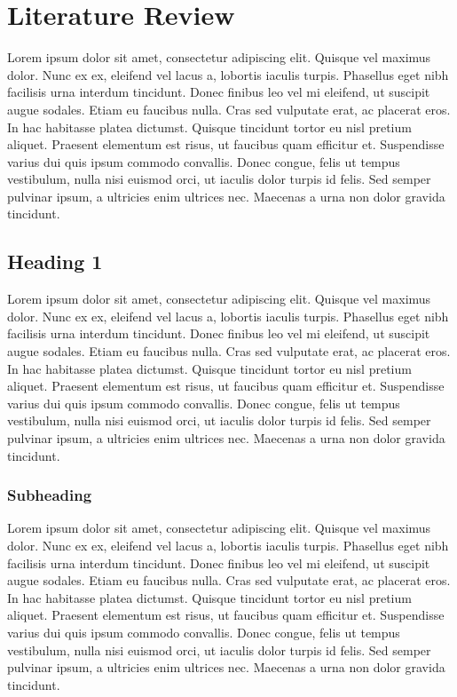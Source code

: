 \chapter{Literature Review}
\label{chp:b2}

	Lorem ipsum dolor sit amet, consectetur adipiscing elit. Quisque vel maximus dolor. Nunc ex ex, eleifend vel lacus a, lobortis iaculis turpis. Phasellus eget nibh facilisis urna interdum tincidunt. Donec finibus leo vel mi eleifend, ut suscipit augue sodales. Etiam eu faucibus nulla. Cras sed vulputate erat, ac placerat eros. In hac habitasse platea dictumst. Quisque tincidunt tortor eu nisl pretium aliquet. Praesent elementum est risus, ut faucibus quam efficitur et. Suspendisse varius dui quis ipsum commodo convallis. Donec congue, felis ut tempus vestibulum, nulla nisi euismod orci, ut iaculis dolor turpis id felis. Sed semper pulvinar ipsum, a ultricies enim ultrices nec. Maecenas a urna non dolor gravida tincidunt.

\section{Heading 1}
Lorem ipsum dolor sit amet, consectetur adipiscing elit. Quisque vel maximus dolor. Nunc ex ex, eleifend vel lacus a, lobortis iaculis turpis. Phasellus eget nibh facilisis urna interdum tincidunt. Donec finibus leo vel mi eleifend, ut suscipit augue sodales. Etiam eu faucibus nulla. Cras sed vulputate erat, ac placerat eros. In hac habitasse platea dictumst. Quisque tincidunt tortor eu nisl pretium aliquet. Praesent elementum est risus, ut faucibus quam efficitur et. Suspendisse varius dui quis ipsum commodo convallis. Donec congue, felis ut tempus vestibulum, nulla nisi euismod orci, ut iaculis dolor turpis id felis. Sed semper pulvinar ipsum, a ultricies enim ultrices nec. Maecenas a urna non dolor gravida tincidunt.

	\subsection{Subheading}
	\label{subsec:subheading}
	Lorem ipsum dolor sit amet, consectetur adipiscing elit. Quisque vel maximus dolor. Nunc ex ex, eleifend vel lacus a, lobortis iaculis turpis. Phasellus eget nibh facilisis urna interdum tincidunt. Donec finibus leo vel mi eleifend, ut suscipit augue sodales. Etiam eu faucibus nulla. Cras sed vulputate erat, ac placerat eros. In hac habitasse platea dictumst. Quisque tincidunt tortor eu nisl pretium aliquet. Praesent elementum est risus, ut faucibus quam efficitur et. Suspendisse varius dui quis ipsum commodo convallis. Donec congue, felis ut tempus vestibulum, nulla nisi euismod orci, ut iaculis dolor turpis id felis. Sed semper pulvinar ipsum, a ultricies enim ultrices nec. Maecenas a urna non dolor gravida tincidunt.
